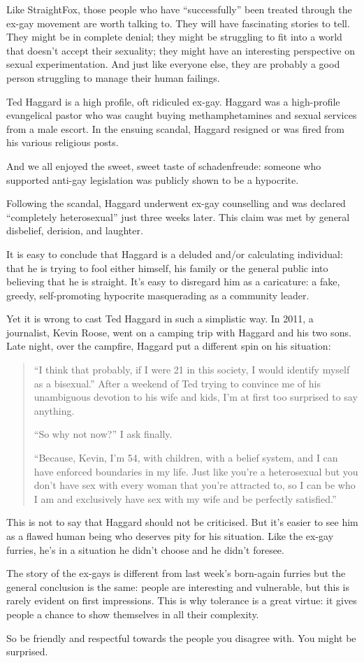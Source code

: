 Like StraightFox, those people who have ``successfully'' been treated through the ex-gay movement are worth talking to. They will have fascinating stories to tell. They might be in complete denial; they might be struggling to fit into a world that doesn't accept their sexuality; they might have an interesting perspective on sexual experimentation. And just like everyone else, they are probably a good person struggling to manage their human failings.

Ted Haggard is a high profile, oft ridiculed ex-gay. Haggard was a high-profile evangelical pastor who was caught buying methamphetamines and sexual services from a male escort. In the ensuing scandal, Haggard resigned or was fired from his various religious posts.

And we all enjoyed the sweet, sweet taste of schadenfreude: someone who supported anti-gay legislation was publicly shown to be a hypocrite.

Following the scandal, Haggard underwent ex-gay counselling and was declared ``completely heterosexual'' just three weeks later. This claim was met by general disbelief, derision, and laughter.

It is easy to conclude that Haggard is a deluded and/or calculating individual: that he is trying to fool either himself, his family or the general public into believing that he is straight. It's easy to disregard him as a caricature: a fake, greedy, self-promoting hypocrite masquerading as a community leader.

Yet it is wrong to cast Ted Haggard in such a simplistic way. In 2011, a journalist, Kevin Roose, went on a camping trip with Haggard and his two sons. Late night, over the campfire, Haggard put a different spin on his situation:

\begin{quotation}
  ``I think that probably, if I were 21 in this society, I would identify myself as a bisexual.'' After a weekend of Ted trying to convince me of his unambiguous devotion to his wife and kids, I'm at first too surprised to say anything.

  ``So why not now?'' I ask finally.

  ``Because, Kevin, I'm 54, with children, with a belief system, and I can have enforced boundaries in my life. Just like you're a heterosexual but you don't have sex with every woman that you're attracted to, so I can be who I am and exclusively have sex with my wife and be perfectly satisfied.''
\end{quotation}

This is not to say that Haggard should not be criticised. But it's easier to see him as a flawed human being who deserves pity for his situation. Like the ex-gay furries, he's in a situation he didn't choose and he didn't foresee.

The story of the ex-gays is different from last week's born-again furries but the general conclusion is the same: people are interesting and vulnerable, but this is rarely evident on first impressions. This is why tolerance is a great virtue: it gives people a chance to show themselves in all their complexity.

So be friendly and respectful towards the people you disagree with. You might be surprised.
